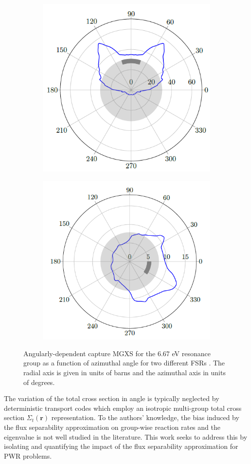 \begin{figure}[hb!]
\begin{subfigure}{.45\textwidth}
  \centering
  \includegraphics[width=0.8\linewidth]{figures/batman-1}
  \caption{}
  \label{fig:batman-plots-a}
\end{subfigure}
\begin{subfigure}{.45\textwidth}
  \centering
  \includegraphics[width=0.8\linewidth]{figures/batman-2}
  \caption{}
  \label{fig:batman-plots-b}
\end{subfigure}
\caption{Angularly-dependent capture MGXS for the 6.67 eV resonance group as a function of azimuthal angle for two different FSRs \citep{gibson2016thesis}. The radial axis is given in units of barns and the azimuthal axis in units of degrees.}
\label{fig:batman-plots}
\end{figure}

The variation of the total cross section in angle is typically neglected by deterministic transport codes which employ an isotropic multi-group total cross section $\Sigma_{t}(\mathbf{r})$ representation. To the authors' knowledge, the bias induced by the flux separability approximation on group-wise reaction rates and the eigenvalue is not well studied in the literature. This work seeks to address this by isolating and quantifying the impact of the flux separability approximation for PWR problems.
